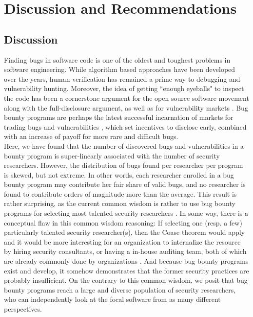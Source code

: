 \section{Discussion and Recommendations}
\label{sec:discussion}

\subsection{Discussion}
Finding bugs in software code is one of the oldest and toughest problems in software engineering. While algorithm based approaches have been developed over the years, human verification has remained a prime way to debugging and vulnerability hunting. Moreover, the idea of getting ``enough eyeballs" to inspect the code has been a cornerstone argument for the open source software movement \cite{raymond1999cathedral} along with the full-disclosure argument, as well as for vulnerability markets \cite{bohme2006comparison}. Bug bounty programs are perhaps the latest successful incarnation of markets for trading bugs and vulnerabilities \cite{bohme2006comparison}, which set incentives to disclose early, combined with an increase of payoff for more rare and difficult bugs.\\

Here, we have found that the number of discovered bugs and vulnerabilities in a bounty program is super-linearly associated with the number of security researchers. However, the distribution of bugs found per researcher per program is skewed, but not extreme. In other words, each researcher enrolled in a bug bounty program may contribute her fair share of valid bugs, and no researcher is found to contribute orders of magnitude more than the average. This result is rather surprising, as the current common wisdom is rather to use bug bounty programs for selecting most talented security researchers \cite{moussouris2016}. In some way, there is a conceptual flaw in this common wisdom reasoning: If selecting one (resp. a few) particularly talented security researcher(s), then the Coase theorem would apply and it would be more interesting for an organization to internalize the resource by hiring security consultants, or having a in-house auditing team, both of which are already commonly done by organizations  \cite{coase1937}. And because bug bounty programs exist and develop, it somehow demonstrates that the former security practices are probably insufficient. On the contrary to this common wisdom, we posit that bug bounty programs reach a large and diverse population of security researchers, who can independently look at the focal software from as many different perspectives. \\

